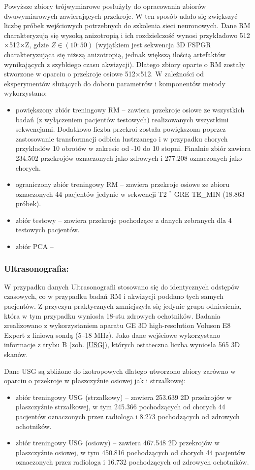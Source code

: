 Powyższe zbiory trójwymiarowe posłużyły do opracowania zbiorów dwuwymiarowych zawierających przekroje. W ten sposób udało się zwiększyć liczbę próbek wejściowych potrzebnych do szkolenia sieci neuronowych. Dane RM charakteryzują się wysoką anizotropią i ich rozdzielczość wynosi przykładowo 512$\times$512$\times$Z, gdzie $Z\in(10:50)$ (wyjątkiem jest sekwencja 3D FSPGR charakteryzująca się niższą anizotropią, jednak większą ilością artefaktów wynikających z szybkiego czasu akwizycji). Dlatego zbiory oparte o RM zostały stworzone w oparciu o przekroje osiowe 512$\times$512. W zależności od eksperymentów służących do doboru parametrów i komponentów metody wykorzystano:
\begin{itemize}
	\item powiększony zbiór treningowy RM -- zawiera przekroje osiowe ze wszystkich badań (z wyłączeniem pacjentów testowych) realizowanych wszystkimi sekwencjami. Dodatkowo liczba przekroi została powiększona poprzez zastosowanie transformacji odbicia lustrzanego i w przypadku chorych przykładów 10 obrotów w zakresie od -10 do 10 stopni. Finalnie zbiór zawiera 234.502 przekrojów oznaczonych jako zdrowych i 277.208 oznaczonych jako chorych.
	\item ograniczony zbiór treningowy RM -- zawiera przekroje osiowe ze zbioru oznaczonych 44 pacjentów jedynie w sekwencji T2 $^\ast$ GRE TE\_MIN (18.863 próbek).
	\item zbiór testowy -- zawiera przekroje pochodzące z danych zebranych dla 4 testowych pacjentów.
	\item zbiór PCA --
\end{itemize}

\subsubsection{Ultrasonografia:}
W przypadku danych Ultrasonografii stosowano się do identycznych odstępów czasowych, co w przypadku badań RM i akwizycji poddano tych samych pacjentów. Z przyczyn praktycznych zmniejszyła się jedynie grupa odniesienia, która w tym przypadku wyniosła 18-stu zdrowych ochotników. Badania zrealizowano z wykorzystaniem aparatu GE 3D high-resolution Voluson E8 Expert z liniową sondą (5--18 MHz). Jako dane wejściowe wykorzystano informacje z trybu B (zob. \ref{USG}), których ostateczna liczba wyniosła 565 3D skanów. 

Dane USG są zbliżone do izotropowych dlatego utworzono zbiory zarówno w oparciu o przekroje w płaszczyźnie osiowej jak i strzałkowej:
 \begin{itemize}
 	\item zbiór treningowy USG (strzałkowy) -- zawiera 253.639 2D przekrojów w płaszczyźnie strzałkowej, w tym 245.366 pochodzących od chorych 44 pacjentów oznaczonych przez radiologa i 8.273 pochodzących od zdrowych ochotników.
 	\item zbiór treningowy USG (osiowy) -- zawiera 467.548 2D przekrojów w płaszczyźnie osiowej, w tym 450.816 pochodzących od chorych 44 pacjentów oznaczonych przez radiologa i 16.732 pochodzących od zdrowych ochotników. 
 \end{itemize}

